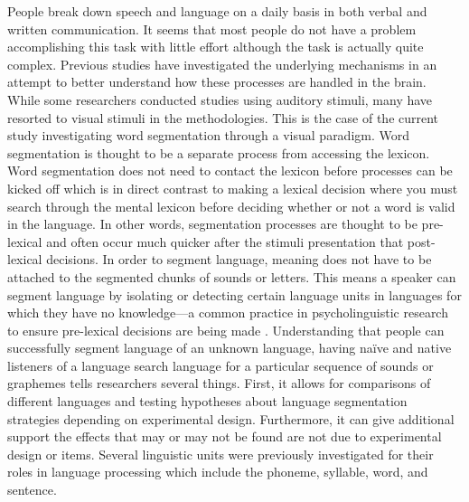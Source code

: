 People break down speech and language on a daily basis in both verbal and written communication. It seems that most people do not have a problem accomplishing this task with little effort although the task is actually quite complex.  Previous studies have investigated the underlying mechanisms in an attempt to better understand how these processes are handled in the brain. While some researchers conducted studies using auditory stimuli, many have resorted to visual stimuli in the methodologies. This is the case of the current study investigating word segmentation through a visual paradigm. Word segmentation is thought to be a separate process from accessing the lexicon. Word segmentation does not need to contact the lexicon before processes can be kicked off which is in direct contrast to making a lexical decision where you must search through the mental lexicon before deciding whether or not a word is valid in the language. In other words, segmentation processes are thought to be pre-lexical and often occur much quicker after the stimuli presentation that post-lexical decisions. In order to segment language, meaning does not have to be attached to the segmented chunks of sounds or letters. This means a speaker can segment language by isolating or detecting certain language units in languages for which they have no knowledge—a common practice in psycholinguistic research to ensure pre-lexical decisions are being made \parencite{Cutler1986-zl}. Understanding that people can successfully segment language of an unknown language, having naïve and native listeners of a language search language for a particular sequence of sounds or graphemes tells researchers several things. First, it allows for comparisons of different languages and testing hypotheses about language segmentation strategies depending on experimental design. Furthermore, it can give additional support the effects that may or may not be found are not due to experimental design or items. Several linguistic units were previously investigated for their roles in language processing which include the phoneme, syllable, word, and sentence. 



